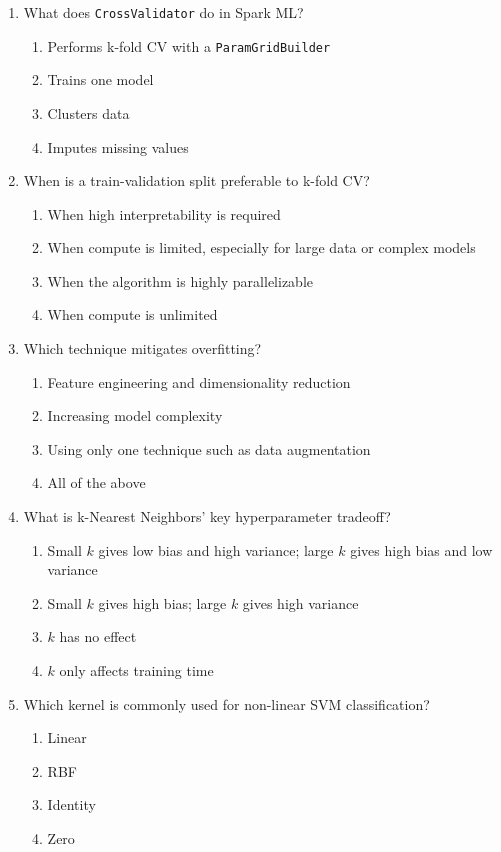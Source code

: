 \documentclass[11pt]{article}
\begin{document}
\begin{enumerate}[leftmargin=*, label=\textbf{Q\arabic*.}, start=58]
		\item What does \texttt{CrossValidator} do in Spark ML?
		\begin{enumerate}[label=(\alph*)]
			\item Performs k-fold CV with a \texttt{ParamGridBuilder}
			\item Trains one model
			\item Clusters data
			\item Imputes missing values
		\end{enumerate}
		
		\item When is a train-validation split preferable to k-fold CV?
		\begin{enumerate}[label=(\alph*)]
			\item When high interpretability is required
			\item When compute is limited, especially for large data or complex models
			\item When the algorithm is highly parallelizable
			\item When compute is unlimited
		\end{enumerate}
		
		\item Which technique mitigates overfitting?
		\begin{enumerate}[label=(\alph*)]
			\item Feature engineering and dimensionality reduction
			\item Increasing model complexity
			\item Using only one technique such as data augmentation
			\item All of the above
		\end{enumerate}
		
		\item What is k-Nearest Neighbors' key hyperparameter tradeoff?
		\begin{enumerate}[label=(\alph*)]
			\item Small $k$ gives low bias and high variance; large $k$ gives high bias and low variance
			\item Small $k$ gives high bias; large $k$ gives high variance
			\item $k$ has no effect
			\item $k$ only affects training time
		\end{enumerate}
		
		\item Which kernel is commonly used for non-linear SVM classification?
		\begin{enumerate}[label=(\alph*)]
			\item Linear
			\item RBF
			\item Identity
			\item Zero
		\end{enumerate}
		

\end{enumerate}
\end{document}
